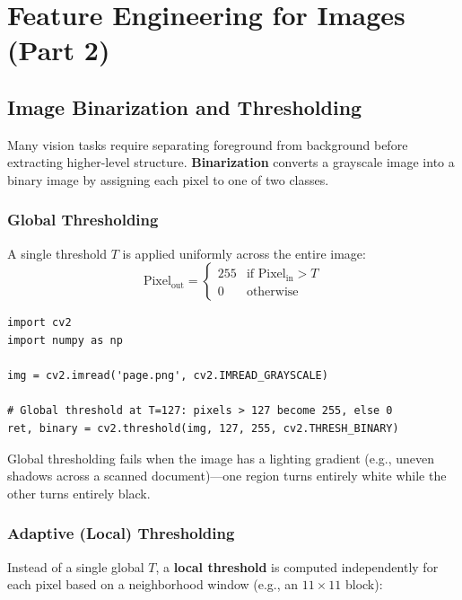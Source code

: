 \chapter*{Feature Engineering for Images (Part 2)}

\section*{Image Binarization and Thresholding}

Many vision tasks require separating foreground from background before extracting higher-level structure. \textbf{Binarization} converts a grayscale image into a binary image by assigning each pixel to one of two classes.

\subsection*{Global Thresholding}

A single threshold $T$ is applied uniformly across the entire image:
$$
\text{Pixel}_{\text{out}} =
\begin{cases}
255 & \text{if } \text{Pixel}_{\text{in}} > T \\
0 & \text{otherwise}
\end{cases}
$$

\begin{lstlisting}[style=pythonstyle]
import cv2
import numpy as np

img = cv2.imread('page.png', cv2.IMREAD_GRAYSCALE)

# Global threshold at T=127: pixels > 127 become 255, else 0
ret, binary = cv2.threshold(img, 127, 255, cv2.THRESH_BINARY)
\end{lstlisting}

\begin{remark}
Global thresholding fails when the image has a lighting gradient (e.g., uneven shadows across a scanned document)---one region turns entirely white while the other turns entirely black.
\end{remark}

\subsection*{Adaptive (Local) Thresholding}

Instead of a single global $T$, a \textbf{local threshold} is computed independently for each pixel based on a neighborhood window (e.g., an $11 \times 11$ block):

